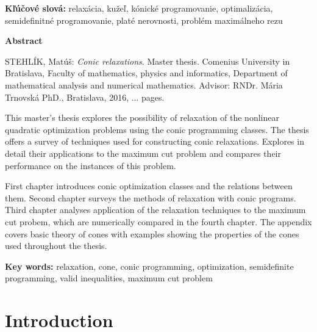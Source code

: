 \documentclass[12pt]{book}
\theoremstyle{definition}
\begin{document}
\bigskip

{\bf Kľúčové slová: }relaxácia, kužeľ, kónické programovanie, optimalizácia, se\-mi\-de\-fi\-ni\-tné programovanie, platé nerovnosti, problém maximálneho rezu \\

\newpage

{\large\bf Abstract}

\medskip

STEHLÍK, Matúš: {\it Conic relaxations}. Master thesis. Comenius University in Bratislava, Faculty of mathematics, physics and informatics, Department of mathematical analysis and numerical mathematics. Advisor:  RNDr. Mária Trnovská PhD., Bratislava, 2016, ... pages.

\bigskip

This master's thesis explores the possibility of relaxation of the nonlinear quadratic optimization problems using the conic programming classes. The thesis offers a survey of techniques used for constructing conic relaxations. Explores in detail their applications to the maximum cut problem and compares their performance on the instances of this problem.

First chapter introduces conic optimization classes and the relations between them. Second chapter surveys the methods of relaxation with conic programs. Third chapter analyses application of the relaxation techniques to the maximum cut probem, which are numerically compared in the fourth chapter. The appendix covers basic theory of cones with examples showing the properties of the cones used throughout the thesis. 


\bigskip

{\bf Key words: } relaxation, cone, conic programming, optimization, semidefinite programming, valid inequalities, maximum cut problem

\vfill\null\eject

\begin{spacing}{0.95}
\tableofcontents
\listoffigures
\begingroup
\let\clearpage\relax
\listoftables
\endgroup
\end{spacing}

\mainmatter

\chapter*{Introduction}
\end{document}
